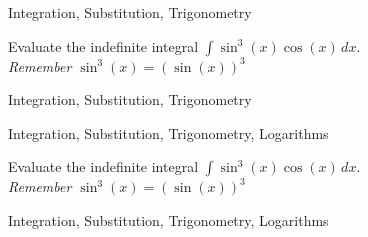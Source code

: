 \begin{tagblock}{Integration, Substitution, Trigonometry}
\begin{question}

Evaluate the indefinite integral $\displaystyle \int  \sin^3(x) \cos(x) \, dx$.  \\
 \emph{Remember $\sin^3(x) = (\sin(x))^3$}



	
	
\begin{tags}
	  Integration, Substitution, Trigonometry
\end{tags}
	
\begin{diary}
	   
\end{diary}
	
\begin{solution}
	   
	    \end{enumerate}
\end{solution}
	
\end{question}

\end{tagblock}

\begin{tagblock}{Integration, Substitution, Trigonometry, Logarithms}
\begin{question}

Evaluate the indefinite integral $\displaystyle \int  \sin^3(x) \cos(x) \, dx$.  \\
 \emph{Remember $\sin^3(x) = (\sin(x))^3$}



	
	
\begin{tags}
	  Integration, Substitution, Trigonometry, Logarithms
\end{tags}
	
\begin{diary}
	   
\end{diary}
	
\begin{solution}
	   
	    \end{enumerate}
\end{solution}
	
\end{question}

\end{tagblock}

